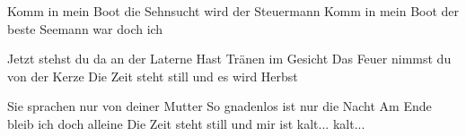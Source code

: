 \documentclass[../../../songbook.tex]{subfiles}
\begin{document}
Komm in mein Boot die Sehnsucht wird der Steuermann			\newline
Komm in mein Boot der beste Seemann war doch ich			\newline
 
\-\hspace{1cm} Jetzt stehst du da an der Laterne			\newline
\-\hspace{1cm} Hast Tränen im Gesicht			\newline
\-\hspace{1cm} Das Feuer nimmst du von der Kerze			\newline
\-\hspace{1cm} Die Zeit steht still und es wird Herbst			\newline
 
\-\hspace{1cm} Sie sprachen nur von deiner Mutter			\newline
\-\hspace{1cm} So gnadenlos ist nur die Nacht			\newline
\-\hspace{1cm} Am Ende bleib ich doch alleine			\newline
\-\hspace{1cm} Die Zeit steht still und mir ist kalt... kalt...   \newline
\end{document}
